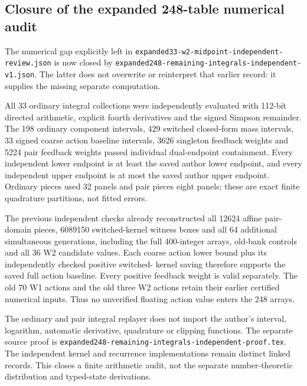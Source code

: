 \subsection{Closure of the expanded 248-table numerical audit}
\label{sec:expanded248-numeric-audit-closure}
The numerical gap explicitly left in
\texttt{expanded33-w2-midpoint-independent-review.json} is now closed by
\texttt{expanded248-remaining-integrals-independent-v1.json}.
The latter does not overwrite or reinterpret that earlier record: it
supplies the missing separate computation.

All 33 ordinary integral collections were independently evaluated with
112-bit directed arithmetic, explicit fourth derivatives and the signed
Simpson remainder.  The 198 ordinary component intervals, 429 switched
closed-form mass intervals, 33 signed coarse action baseline intervals,
3626 singleton feedback weights and 5224 pair feedback weights passed
individual dual-endpoint containment.  Every independent lower endpoint
is at least the saved author lower endpoint, and every independent upper
endpoint is at most the saved author upper endpoint.  Ordinary pieces
used 32 panels and pair pieces eight panels; these are exact finite
quadrature partitions, not fitted errors.

The previous independent checks already reconstructed all 12624 affine
pair-domain pieces, 6089150 switched-kernel witness boxes and all 64
additional simultaneous generations, including the full 400-integer
arrays, old-bank controls and all 36 W2 candidate values.  Each coarse
action lower bound plus its independently checked positive switched-
kernel saving therefore supports the saved full action baseline.  Every
positive feedback weight is valid separately.  The old 70 W1 actions
and the old three W2 actions retain their earlier certified numerical
inputs.  Thus no unverified floating action value enters the 248 arrays.

The ordinary and pair integral replayer does not import the author's
interval, logarithm, automatic derivative, quadrature or clipping
functions.  The separate source proof is
\texttt{expanded248-remaining-integrals-independent-proof.tex}.
The independent kernel and recurrence implementations remain distinct
linked records.  This closes a finite arithmetic audit, not the separate
number-theoretic distribution and typed-state derivations.

